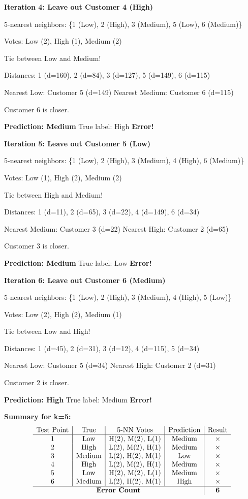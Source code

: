 \documentclass[12pt]{article}
\begin{document}
\begin{solution}
\textbf{Iteration 4: Leave out Customer 4 (High)}

5-nearest neighbors: \{1 (Low), 2 (High), 3 (Medium), 5 (Low), 6 (Medium)\}

Votes: Low (2), High (1), Medium (2)

Tie between Low and Medium!

Distances: 1 (d=160), 2 (d=84), 3 (d=127), 5 (d=149), 6 (d=115)

Nearest Low: Customer 5 (d=149)
Nearest Medium: Customer 6 (d=115)

Customer 6 is closer.

\textbf{Prediction: Medium} \quad True label: High \quad \textbf{Error!}

\textbf{Iteration 5: Leave out Customer 5 (Low)}

5-nearest neighbors: \{1 (Low), 2 (High), 3 (Medium), 4 (High), 6 (Medium)\}

Votes: Low (1), High (2), Medium (2)

Tie between High and Medium!

Distances: 1 (d=11), 2 (d=65), 3 (d=22), 4 (d=149), 6 (d=34)

Nearest Medium: Customer 3 (d=22)
Nearest High: Customer 2 (d=65)

Customer 3 is closer.

\textbf{Prediction: Medium} \quad True label: Low \quad \textbf{Error!}

\textbf{Iteration 6: Leave out Customer 6 (Medium)}

5-nearest neighbors: \{1 (Low), 2 (High), 3 (Medium), 4 (High), 5 (Low)\}

Votes: Low (2), High (2), Medium (1)

Tie between Low and High!

Distances: 1 (d=45), 2 (d=31), 3 (d=12), 4 (d=115), 5 (d=34)

Nearest Low: Customer 5 (d=34)
Nearest High: Customer 2 (d=31)

Customer 2 is closer.

\textbf{Prediction: High} \quad True label: Medium \quad \textbf{Error!}

\textbf{Summary for k=5:}
\[
\begin{array}{c|c|c|c|c}
\text{Test Point} & \text{True} & \text{5-NN Votes} & \text{Prediction} & \text{Result} \\
\hline
1 & \text{Low} & \text{H(2), M(2), L(1)} & \text{Medium} & \times \\
2 & \text{High} & \text{L(2), M(2), H(1)} & \text{Medium} & \times \\
3 & \text{Medium} & \text{L(2), H(2), M(1)} & \text{Low} & \times \\
4 & \text{High} & \text{L(2), M(2), H(1)} & \text{Medium} & \times \\
5 & \text{Low} & \text{H(2), M(2), L(1)} & \text{Medium} & \times \\
6 & \text{Medium} & \text{L(2), H(2), M(1)} & \text{High} & \times \\
\hline
\multicolumn{4}{c|}{\textbf{Error Count}} & \mathbf{6} \\
\end{array}
\]


\end{solution}
\end{document}
